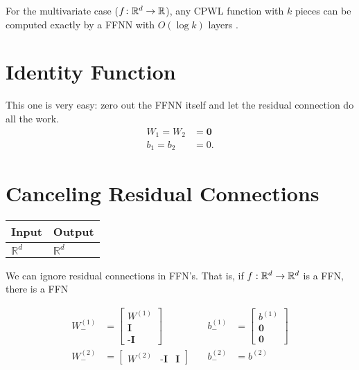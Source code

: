 For the multivariate case ($f \colon \mathbb{R}^d \to \mathbb{R}$), any CPWL function with $k$ pieces can be computed exactly by a FFNN with $O(\log k)$ layers \citep{arora+:2018}.

\section{Identity Function}\label{sec:ffnn_identity}

This one is very easy: zero out the FFNN itself and let the residual connection do all the work.
\begin{align*}
W_1 = W_2 &= \mathbf{0} \\
b_1 = b_2 &= 0.
\end{align*}

\section{Canceling Residual Connections}\label{sec:ffnn_cancel_residual}

    \begin{tabular}{|p{1.5cm}|p{1.5cm}|}
        \hline
        \rowcolor{orange!20} %
        \textbf{Input} & \textbf{Output} \\
        \hline
        $\mathbb{R}^d$ & $\mathbb{R}^d$ \\
        \hline
    \end{tabular}

    We can ignore residual connections in FFN's. That is, if $f:\mathbb{R}^d\to \mathbb{R}^d$ is a FFN, there is a FFN

    \begin{align*}
        W_-^{(1)}&=\begin{bmatrix}
            W^{(1)}\\
            \textbf{I}\\
            \textbf{-I}
        \end{bmatrix}  &\quad b_-^{(1)}&=\begin{bmatrix}
            b^{(1)}\\
            \textbf{0}\\
            \textbf{0}
        \end{bmatrix}\\
        W_-^{(2)}&=\begin{bmatrix}
            W^{(2)}& \textbf{-I} & \textbf{I}
        \end{bmatrix}
        & \quad b_-^{(2)} &= b^{(2)}
    \end{align*}

